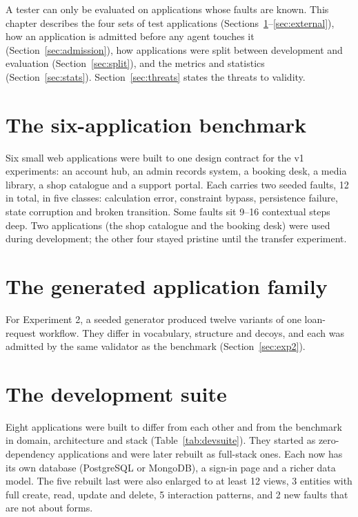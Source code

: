 \label{chap.6}

A tester can only be evaluated on applications whose faults are known. This chapter
describes the four sets of test applications (Sections~\ref{sec:benchmark}--\ref{sec:external}),
how an application is admitted before any agent touches it
(Section~\ref{sec:admission}), how applications were split between development and
evaluation (Section~\ref{sec:split}), and the metrics and statistics
(Section~\ref{sec:stats}). Section~\ref{sec:threats} states the threats to validity.

\section{The six-application benchmark}
\label{sec:benchmark}

Six small web applications were built to one design contract for the v1 experiments: an
account hub, an admin records system, a booking desk, a media library, a shop catalogue and a
support portal. Each carries two seeded faults, 12 in total, in five classes: calculation
error, constraint bypass, persistence failure, state corruption and broken transition. Some
faults sit 9--16 contextual steps deep. Two applications (the shop catalogue and the
booking desk) were used during development; the other four stayed pristine until the
transfer experiment.

\section{The generated application family}

For Experiment 2, a seeded generator produced twelve variants of one loan-request workflow.
They differ in vocabulary, structure and decoys, and each was admitted by the same validator
as the benchmark (Section~\ref{sec:exp2}).

\section{The development suite}
\label{sec:devsuite}

Eight applications were built to differ from each other and from the benchmark in domain,
architecture and stack (Table~\ref{tab:devsuite}). They started as zero-dependency
applications and were later rebuilt as full-stack ones. Each now has its own database (PostgreSQL or MongoDB), a
sign-in page and a richer data model. The five rebuilt last were also enlarged to at least 12
views, 3 entities with full create, read, update and delete, 5 interaction patterns, and 2
new faults that are not about forms.

